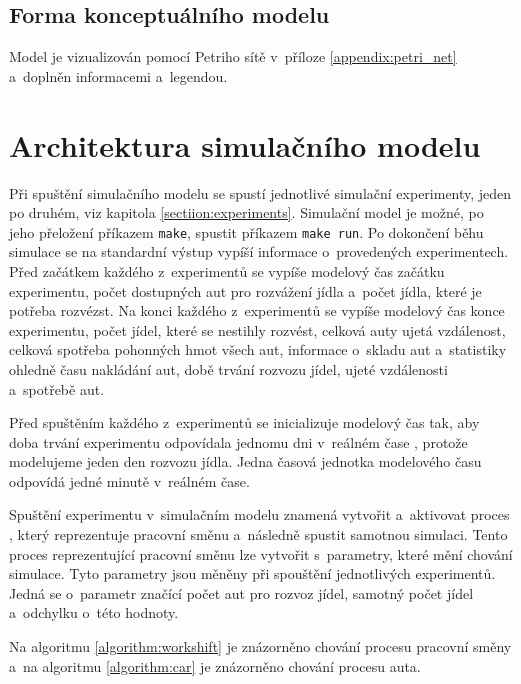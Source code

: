 \documentclass[a4paper, 11pt]{article}
\begin{document}
	\subsection{Forma konceptuálního modelu}

	Model je vizualizován pomocí Petriho sítě v~příloze
	\ref{appendix:petri_net} a~doplněn informacemi a~legendou.



	\section{Architektura simulačního modelu}

	Při spuštění simulačního modelu \cite[snímek 44]{IMS_slides} se spustí
	jednotlivé simulační experimenty, jeden po druhém, viz kapitola
	\ref{sectiion:experiments}. Simulační model je možné, po jeho přeložení
	příkazem \texttt{make}, spustit příkazem \texttt{make run}. Po dokončení
	běhu simulace se na standardní výstup vypíší informace o~provedených
	experimentech. Před začátkem každého z~experimentů se vypíše modelový
	čas \cite[snímek 21]{IMS_slides} začátku experimentu, počet dostupných
	aut pro rozvážení jídla a~počet jídla, které je potřeba rozvézst. Na
	konci každého z~experimentů se vypíše modelový čas konce experimentu,
	počet jídel, které se nestihly rozvést, celková auty ujetá vzdálenost,
	celková spotřeba pohonných hmot všech aut, informace o~skladu
	\cite[snímek 184]{IMS_slides} aut a~statistiky ohledně času nakládání aut,
	době trvání rozvozu jídel, ujeté vzdálenosti a~spotřebě aut.

	Před spuštěním každého z~experimentů se inicializuje modelový čas tak, aby
	doba trvání experimentu odpovídala jednomu dni v~reálném čase
	\cite[snímek 21]{IMS_slides}, protože modelujeme jeden den rozvozu jídla.
	Jedna časová jednotka modelového času odpovídá jedné minutě v~reálném
	čase.

	Spuštění experimentu v~simulačním modelu znamená vytvořit a~aktivovat
	proces \cite[snímek 121]{IMS_slides}, který reprezentuje pracovní směnu
	a~následně spustit samotnou simulaci. Tento proces reprezentující
	pracovní směnu lze vytvořit s~parametry, které mění chování simulace.
	Tyto parametry jsou měněny při spouštění jednotlivých experimentů. Jedná
	se o~parametr značící počet aut pro rozvoz jídel, samotný počet jídel
	a~odchylku o~této hodnoty.

	Na algoritmu \ref{algorithm:workshift} je znázorněno chování procesu
	pracovní směny a~na algoritmu \ref{algorithm:car} je znázorněno chování
	procesu auta. \\
\end{document}
